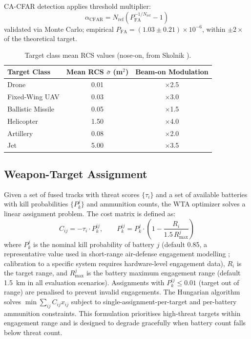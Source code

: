 \documentclass[drones,article,submit,pdftex]{Definitions/mdpi}
\begin{document}
CA-CFAR detection \cite{ref_cfar_review} applies threshold multiplier:
\begin{equation}
  \alpha_\text{CFAR} = N_\text{ref}\!\left(P_\text{FA}^{-1/N_\text{ref}} - 1\right)
  \label{eq:cfar}
\end{equation}
validated via Monte Carlo; empirical $P_\text{FA} = (1.03 \pm 0.21)\times 10^{-6}$,
within $\pm 2\times$ of the theoretical target.

\begin{table}[ht]
  \centering
  \caption{Target class mean RCS values (nose-on, from Skolnik \cite{ref_skolnik}).}
  \label{tab:rcs}
  \begin{tabular}{lcc}
    \toprule
    Target Class & Mean RCS $\bar{\sigma}$ (m$^2$) & Beam-on Modulation \\
    \midrule
    Drone         & 0.01 & $\times$2.5 \\
    Fixed-Wing UAV& 0.03 & $\times$3.0 \\
    Ballistic Missile & 0.05 & $\times$1.5 \\
    Helicopter    & 1.50 & $\times$4.0 \\
    Artillery     & 0.08 & $\times$2.0 \\
    Jet           & 5.00 & $\times$3.5 \\
    \bottomrule
  \end{tabular}
\end{table}

\subsection{Weapon-Target Assignment}
\label{sec:wta}

Given a set of fused tracks with threat scores $\{\tau_i\}$ and a set of
available batteries with kill probabilities $\{P_k^j\}$ and ammunition counts,
the WTA optimizer solves a linear assignment problem.
The cost matrix is defined as:
\begin{equation}
  C_{ij} = -\tau_i \cdot P_k^{ij}, \qquad
  P_k^{ij} = P_k^j \cdot \left(1 - \frac{R_i}{1.5\,R_{\max}^j}\right)
  \label{eq:wta_cost}
\end{equation}
where $P_k^j$ is the nominal kill probability of battery $j$
(default 0.85, a representative value used in short-range air-defense
engagement modelling \cite{ref_skolnik}; calibration to a specific
system requires hardware-level engagement data),
$R_i$ is the target range, and $R_{\max}^j$ is the battery maximum engagement range
(default \SI{1.5}{km} in all evaluation scenarios).
Assignments with $P_k^{ij} \leq 0.01$ (target out of range) are penalised to
prevent invalid engagements.
The Hungarian algorithm \cite{ref_hungarian} solves $\min \sum_{ij} C_{ij} x_{ij}$
subject to single-assignment-per-target and per-battery ammunition constraints.
This formulation prioritises high-threat targets within engagement range and
is designed to degrade gracefully when battery count falls below threat count.
\end{document}
